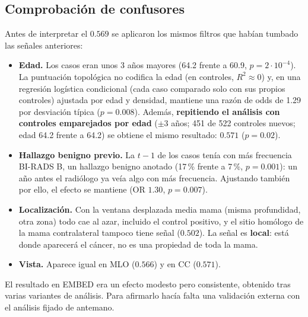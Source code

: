 \begin{table}[H]
\centering
\caption{Anticipación en el sitio de la lesión en EMBED (ventana de 512\,px;
$p$ por 100 permutaciones dentro de cada conjunto).}
\label{tab:embed-sitio}
\end{table}

\subsection{Comprobación de confusores}
Antes de interpretar el $0.569$ se aplicaron los mismos filtros que habían
tumbado las señales anteriores:
\begin{itemize}
  \item \textbf{Edad.} Los casos eran unos 3 años mayores (64.2 frente a
        60.9, $p = 2\cdot10^{-4}$). La puntuación topológica no codifica la
        edad (en controles, $R^2 \approx 0$) y, en una regresión logística
        condicional (cada caso comparado solo con sus propios controles)
        ajustada por edad y densidad, mantiene una razón de odds de 1.29
        por desviación típica ($p = 0.008$). Además, \textbf{repitiendo el
        análisis con controles emparejados por edad} ($\pm 3$ años; 451 de
        522 controles nuevos; edad 64.2 frente a 64.2) se obtiene el mismo
        resultado: $0.571$ ($p = 0.02$).
  \item \textbf{Hallazgo benigno previo.} La $t-1$ de los casos tenía con
        más frecuencia BI-RADS B, un hallazgo benigno anotado (17\,\% frente
        a 7\,\%, $p = 0.001$): un año antes el radiólogo ya veía algo con
        más frecuencia. Ajustando también por ello, el efecto se mantiene
        (OR $1.30$, $p = 0.007$).
  \item \textbf{Localización.} Con la ventana desplazada media mama (misma
        profundidad, otra zona) todo cae al azar, incluido el control
        positivo, y el sitio homólogo de la mama contralateral tampoco tiene
        señal ($0.502$). La señal es \textbf{local}: está donde aparecerá el
        cáncer, no es una propiedad de toda la mama.
  \item \textbf{Vista.} Aparece igual en MLO ($0.566$) y en CC ($0.571$).
\end{itemize}
El resultado en EMBED era un efecto modesto pero consistente, obtenido tras
varias variantes de análisis. Para afirmarlo hacía falta una validación
externa con el análisis fijado de antemano.

